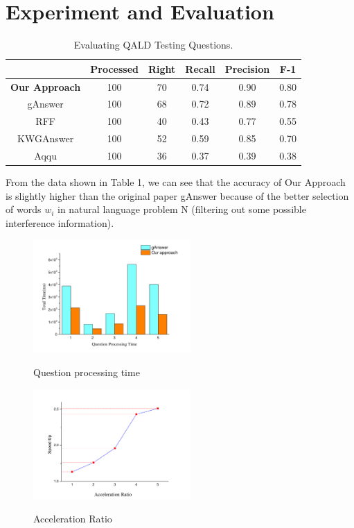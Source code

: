 \documentclass[runningheads]{llncs}
\begin{document}
\section{Experiment and Evaluation}
\begin{table}
	\centering
	\label{table1}
	\caption{Evaluating QALD Testing Questions.}
\begin{tabular}{cccccc}
	\hline
	& Processed& Right& Recall& Precision&F-1\\
	\hline  %
	\textbf{Our Approach} &100 &70 & 0.74& 0.90& 0.80\\
	gAnswer &100 &68 & 0.72& 0.89& 0.78\\
	RFF &100 &40 & 0.43& 0.77& 0.55\\
	KWGAnswer &100 &52 & 0.59& 0.85& 0.70\\
	Aqqu &100 &36 & 0.37& 0.39& 0.38\\
	\hline %
\end{tabular}
\end{table}
From the data shown in Table 1, we can see that the accuracy of Our Approach is slightly higher than the original paper gAnswer because of the better selection of words $w_{i}$ in natural language problem N (filtering out some possible interference information).
\begin{figure}
	\centering
	\begin{minipage}[t]{0.48\textwidth}
		\centering
		\label{fig2}
		\includegraphics[width= 6cm]{QPT.pdf}
		\caption{Question processing time}
	\end{minipage}
	\begin{minipage}[t]{0.48\textwidth}
		\centering
		\label{fig3}
		\includegraphics[width=6cm]{accelaration.pdf}
		\caption{Acceleration Ratio}
	\end{minipage}
\end{figure}
\end{document}
